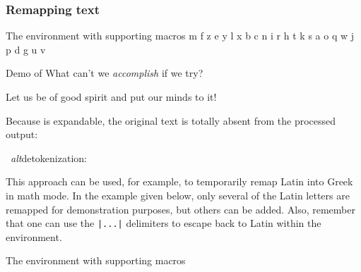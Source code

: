 \documentclass[10pt]{article}
\def\altdecytoks{\par\medskip\begingroup\noindent\macname{cytoks}
  \ \textit{alt}detokenization:\\\raggedright\footnotesize\ttfamily
  \expandafter\altdetokenize\expandafter{\the\cytoks}\normalsize\par
  \endgroup\medskip}
\begin{document}
\endgroup

\subsubsection{Remapping text}

\begin{minipage}[t]{\textwidth}
\begingroup

\begin{exampleC}[]{The  environment with
  supporting macros}
\tokcycleenvironment\remaptext
    {}
    {}
    {}
    {}
\newcommand*\tcmapto[2]{\expandafter\def\csname tcmapto#1\endcsname{#2}}
\newcommand*\tcremap[1]{\ifcsname tcmapto#1\endcsname
  \csname tcmapto#1\expandafter\endcsname\else\expandafter#1\fi}
\tcmapto am   \tcmapto bf   \tcmapto cz   \tcmapto de   \tcmapto ey
\tcmapto fl   \tcmapto gx   \tcmapto hb   \tcmapto ic   \tcmapto jn
\tcmapto ki   \tcmapto lr   \tcmapto mh   \tcmapto nt   \tcmapto ok
\tcmapto ps   \tcmapto qa   \tcmapto ro   \tcmapto sq   \tcmapto tw
\tcmapto uj   \tcmapto vp   \tcmapto wd   \tcmapto xg   \tcmapto yu
\tcmapto zv
\end{exampleC}

\begin{exampleA}[lefthand width=8.5cm]{Demo of }
\remaptext
What can't we \textit{accomplish} if we try?

Let us be of good spirit and put our minds to it!
\endremaptext
\end{exampleA}

Because  is expandable, the original text is totally absent 
  from the processed output:

\altdecytoks

\endgroup
\end{minipage}

\bigskip
\begingroup

This approach can be used, for example, to temporarily remap Latin into Greek in 
  math mode.
In the example given below, only several of the Latin letters are remapped
  for demonstration purposes, but others can be added.
Also, remember that one can use the \verb+|...|+ delimiters to escape back to
  Latin within the environment.

\begin{exampleC}[]{The  environment with
  supporting macros}
\tokcycleenvironment\greek%
{}%
{}%
{}%
{}%
\newcommand*\tcmapto[2]{\expandafter\def\csname tcmapto#1\endcsname{#2}}
\newcommand*\tcremap[1]{\ifcsname tcmapto#1\endcsname
  \csname tcmapto#1\expandafter\endcsname\else\expandafter#1\fi}
\tcmapto a\alpha \tcmapto b\beta \tcmapto e\epsilon 
\tcmapto g\gamma \tcmapto p\pi
\end{exampleC}
\end{document}
